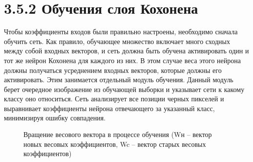 \documentclass[14pt,a4paper]{extreport}
\begin{document}
                  \section*{\normalsize\hspace{4ex}3.5.2 Обучения слоя Кохонена}
  \hspace {4ex} Чтобы коэффициенты входов были правильно настроены, необходимо сначала обучить сеть. Как правило, обучающее множество включает много сходных между собой входных векторов, и сеть должна быть обучена активировать один и тот же нейрон Кохонена для каждого из них. В этом случае веса этого нейрона должны получаться усреднением входных векторов, которые должны его активировать. Этим занимается отдельный модуль обучения. Данный модуль берет очередное изображение из обучающей выборки и указывает сети к какому классу оно относиться. Сеть анализирует все позиции черных пикселей и выравнивает коэффициенты нейрона отвечающего за указанный класс, минимизируя ошибку совпадения.\
  
  \begin{figure}[h!]
\caption{Вращение весового вектора в процессе обучения
(Wн – вектор новых весовых коэффициентов, Wc – вектор старых весовых коэффициентов)}
\end{figure}
 
\end{document}
